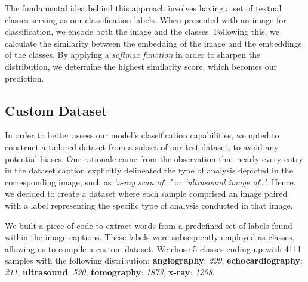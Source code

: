 \documentclass[10pt,twocolumn,letterpaper]{article}
\begin{document}
The fundamental idea behind this approach involves having a set of textual classes serving as our classification labels.
When presented with an image for classification, we encode both the image and the classes.
Following this, we calculate the similarity between the embedding of the image and the embeddings of the classes.
By applying a \textit{softmax function} in order to sharpen the distribution, we determine the highest similarity score, which becomes our prediction.

\subsection{Custom Dataset}
In order to better assess our model's classification capabilities, we opted to construct a tailored dataset from a subset of our test dataset, to avoid any potential biases.
Our rationale came from the observation that nearly every entry in the dataset caption explicitly delineated the type of analysis depicted in the corresponding image, such as \textit{`x-ray scan of\ldots'} or \textit{`ultrasound image of\ldots}'.
Hence, we decided to create a dataset where each sample comprised an image paired with a label representing the specific type of analysis conducted in that image.

We built a piece of code to extract words from a predefined set of labels found within the image captions.
These labels were subsequently employed as classes, allowing us to compile a custom dataset.
We chose 5 classes ending up with 4111 samples with the following distribution: \textbf{angiography}: \textit{299}, \textbf{echocardiography}: \textit{211}, \textbf{ultrasound}: \textit{520}, \textbf{tomography}: \textit{1873}, \textbf{x-ray}: \textit{1208}.

\end{document}

